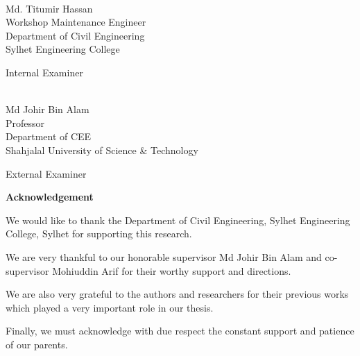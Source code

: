 \documentclass[12pt,a4paper]{article}
\begin{document}
\vspace{0.8cm}

\noindent
\begin{minipage}[t]{0.70\textwidth}
    \noindent\makebox[2.5in]{\hrulefill} \\
    Md. Titumir Hassan \\
    Workshop Maintenance Engineer \\
    Department of Civil Engineering \\
    Sylhet Engineering College
\end{minipage}
\hfill
\begin{minipage}[t]{0.28\textwidth}
    \raggedleft
    Internal Examiner
\end{minipage}

\vspace{0.8cm}

\noindent
\begin{minipage}[t]{0.70\textwidth}
    \noindent\makebox[2.5in]{\hrulefill} \\
    Md Johir Bin Alam \\
    Professor \\
    Department of CEE \\
    Shahjalal University of Science \& Technology
\end{minipage}
\hfill
\begin{minipage}[t]{0.28\textwidth}
    \raggedleft
    External Examiner
\end{minipage}

\newpage
{}
{}
\begin{center}
    \Large \textbf{Acknowledgement}
\end{center}
\vspace{1cm}

We would like to thank the Department of Civil Engineering, Sylhet Engineering College, Sylhet for supporting this research.

We are very thankful to our honorable supervisor Md Johir Bin Alam and co-supervisor Mohiuddin Arif for their worthy support and directions.

We are also very grateful to the authors and researchers for their previous works which played a very important role in our thesis.

Finally, we must acknowledge with due respect the constant support and patience of our parents.

\vspace{2cm}
\end{document}
